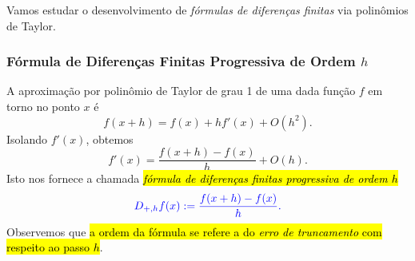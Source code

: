 Vamos estudar o desenvolvimento de \emph{fórmulas de diferenças finitas} via polinômios de Taylor.

\subsubsection{Fórmula de Diferenças Finitas Progressiva de Ordem $h$}

A aproximação por polinômio de Taylor de grau 1 de uma dada função $f$ em torno no ponto $x$ é
\begin{equation}\label{cap_deriv_sec_df:eq:poli_Taylor_grau_1}
  f(x+h) = f(x) + hf'(x) + O(h^2).
\end{equation}
Isolando $f'(x)$, obtemos
\begin{equation}
  f'(x) = \frac{f(x+h) - f(x)}{h} + O(h).
\end{equation}
Isto nos fornece a chamada \hl{\emph{fórmula de diferenças finitas progressiva de ordem $h$}}
\begin{equation}\label{cap_deriv_sec_df:eq:dfp_h}\color{blue}D_{+,h}f(x) := \frac{f(x+h) - f(x)}{h}.
\end{equation}
Observemos que \hl{a ordem da fórmula se refere a do \emph{erro de truncamento} com respeito ao passo $h$}.

